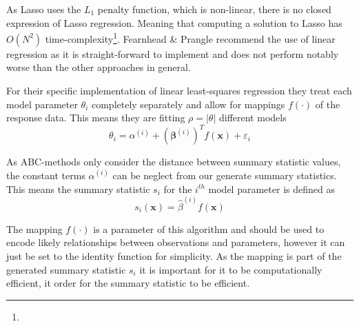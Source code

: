 \documentclass[11pt,a4paper]{article}
\theoremstyle{break}
\begin{document}
  \par As Lasso uses the $L_1$ penalty function, which is non-linear, there is no closed expression of Lasso regression. Meaning that computing a solution to Lasso has $O(N^2)$ time-complexity\footnote{}. Fearnhead \& Prangle recommend the use of linear regression as it is straight-forward to implement and does not perform notably worse than the other approaches in general.

  \par For their specific implementation of linear least-squares regression they treat each model parameter $\theta_i$ completely separately and allow for mappings $f(\cdot)$ of the response data. This means they are fitting $\rho=|\theta|$ different models
  \[ \theta_i=\alpha^{(i)}+(\pmb\beta^{(i)})^Tf(\mathbf{x})+\varepsilon_i \]
  \par As ABC-methods only consider the distance between summary statistic values, the constant terms $\alpha^{(i)}$ can be neglect from our generate summary statistics. This means the summary statistic $s_i$ for the $i^{th}$ model parameter is defined as
  \[ s_i(\mathbf{x})=\hat\beta^{(i)}f(\mathbf{x}) \]

  \par The mapping $f(\cdot)$ is a parameter of this algorithm and should be used to encode likely relationships between observations and parameters, however it can just be set to the identity function for simplicity. As the mapping is part of the generated summary statistic $s_i$ it is important for it to be computationally efficient, it order for the summary statistic to be efficient.
\end{document}
